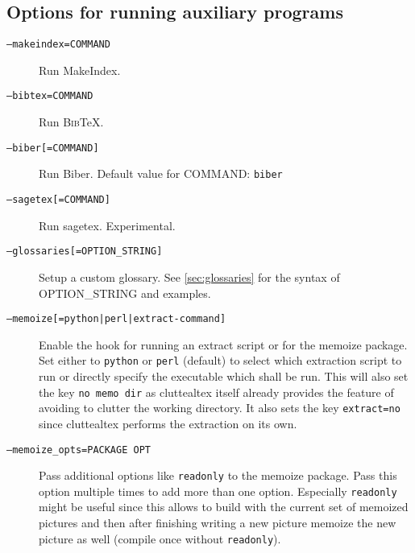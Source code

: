 \documentclass[a4paper]{report}
\providecommand\BibTeX{\textsc{Bib}\TeX\xspace}
\newcommand\metavar[1]{\textnormal{\textsf{#1}}}
\begin{document}
\subsection{Options for running auxiliary programs}
\begin{description}
\item[\texttt{--makeindex=\metavar{COMMAND}}]
  Run MakeIndex.
\item[\texttt{--bibtex=\metavar{COMMAND}}]
  Run \BibTeX.
\item[\texttt{--biber[=\metavar{COMMAND}]}]
  Run Biber. Default value for \metavar{COMMAND}: \texttt{biber}
\item[\texttt{--sagetex[=\metavar{COMMAND}]}]
  Run sagetex. Experimental.
\item[\texttt{--glossaries[=\metavar{OPTION\_STRING}]}]
  Setup a custom glossary. See \autoref{sec:glossaries} for the syntax of \metavar{OPTION\_STRING} and examples.
\item[\texttt{--memoize[=\metavar{python|perl|extract-command}]}]
  Enable the hook for running an extract script or for the memoize package. Set
  either to \texttt{python} or \texttt{perl} (default) to select which
  extraction script to run or directly specify the executable which shall be
  run. This will also set the key \texttt{no memo dir} as cluttealtex itself
  already provides the feature of avoiding to clutter the working directory. It
  also sets the key \texttt{extract=no} since cluttealtex performs the
  extraction on its own.
\item[\texttt{--memoize\_opts=\metavar{PACKAGE OPT}}]
  Pass additional options like \texttt{readonly} to the memoize package. Pass
  this option multiple times to add more than one option.
  Especially \texttt{readonly} might be useful since this allows to build with
  the current set of memoized pictures and then after finishing writing a new
  picture memoize the new picture as well (compile once without
  \texttt{readonly}).
\end{description}
\end{document}
